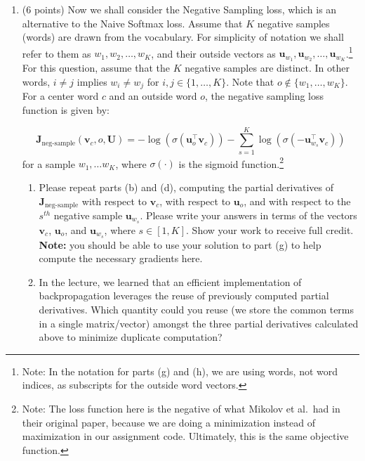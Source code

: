 \documentclass{article}
\begin{document}
\begin{enumerate}[label=(\alph*)]
\item (6 points) Now we shall consider the Negative Sampling loss, which is an alternative to the Naive Softmax loss.  Assume that $K$ negative samples (words) are drawn from the vocabulary. For simplicity of notation we shall refer to them as $w_1, w_2, \dots, w_K$, and their outside vectors as $\bm u_{w_1}, \bm u_{w_2}, \dots, \bm u_{w_K}$.\footnote{Note: In the notation for parts (g) and (h), we are using words, not word indices, as subscripts for the outside word vectors.} For this question, assume that the $K$ negative samples are distinct. In other words, $i\neq j$ implies $w_i\neq w_j$ for $i,j\in\{1,\dots,K\}$.
Note that $o\notin\{w_1, \dots, w_K\}$. 
For a center word $c$ and an outside word $o$, the negative sampling loss function is given by:

\begin{equation}
\bm J_{\text{neg-sample}}(\bm v_c, o, \bm U) = -\log(\sigma(\bm u_o^\top \bm v_c)) - \sum_{s=1}^K \log(\sigma(-\bm u_{w_s}^\top \bm v_c))
\end{equation}
for a sample $w_1, \ldots w_K$, where $\sigma(\cdot)$ is the sigmoid function.\footnote{Note: The loss function here is the negative of what Mikolov et al.\ had in their original paper, because we are doing a minimization instead of maximization in our assignment code. Ultimately, this is the same objective function.}

\begin{enumerate}[label=(\roman*)]
\item Please repeat parts (b) and (d), computing the partial derivatives of $\bm J_{\text{neg-sample}}$ with respect to $\bm v_c$, with respect to $\bm u_o$, and with respect to the $s^{th}$ negative sample $\bm u_{w_s}$. Please write your answers in terms of the vectors $\bm v_c$, $\bm u_o$, and $\bm u_{w_s}$, where $s \in [1, K]$. Show your work to receive full credit. \textbf{Note:} you should be able to use your solution to part (g) to help compute the necessary gradients here.

\item In the lecture, we learned that an efficient implementation of backpropagation leverages the reuse of previously computed partial derivatives. Which quantity could you reuse (we store the common terms in a single matrix/vector) amongst the three partial derivatives calculated above to minimize duplicate computation? 


\end{enumerate}
\end{enumerate}
\end{document}

